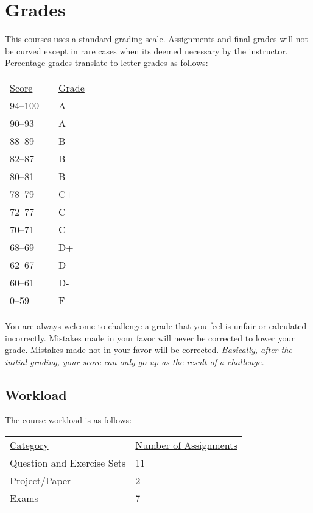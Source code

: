 \documentclass[10pt]{article}
\begin{document}
\section{Grades}

This courses uses a standard grading scale.  Assignments and final grades will not be curved except in rare cases when its deemed necessary by the instructor.  Percentage grades translate to letter grades as follows:

\begin{center}
\begin{small}
\begin{tabular}{lcl}
\underline{Score} & & \underline{Grade} \\
94--100 & & A \\
90--93 & & A- \\
88--89 & & B+ \\
82--87 & & B \\
80--81 & & B- \\
78--79 & & C+ \\
72--77 & & C \\
70--71 & & C- \\
68--69 & & D+ \\
62--67 & & D \\
60--61 & & D- \\
0--59 & & F
\end{tabular}
\end{small}
\end{center}


You are always welcome to challenge a grade that you feel is unfair or calculated incorrectly.  Mistakes made in your favor will never be corrected to lower your grade.  Mistakes made not in your favor will be corrected.  \textit{Basically, after the initial grading, your score can only go up as the result of a challenge.}

\subsection{Workload}

The course workload is as follows:
\begin{center}
  \begin{tabular}{ll}
    \underline{Category} & \underline{Number of Assignments} \\
    Question and Exercise Sets &  11 \\
    Project/Paper &  2 \\
    Exams & 7\\
  \end{tabular}
\end{center}
\end{document}
